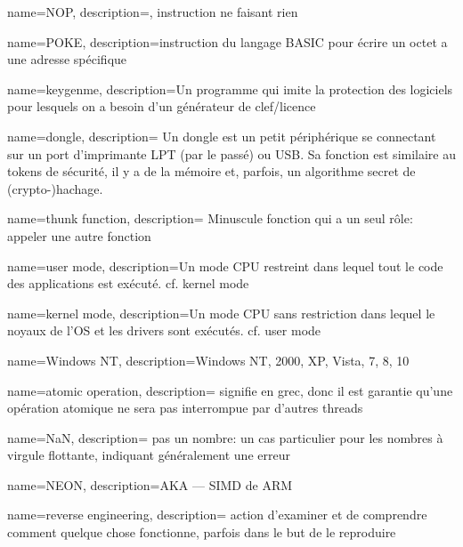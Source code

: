 {
  name=NOP,
  description={, instruction ne faisant rien}
}

{
  name=POKE,
  description={instruction du langage BASIC pour écrire un octet a une adresse spécifique}
}

{
  name=keygenme,
  description={Un programme qui imite la protection des logiciels pour lesquels on a besoin d'un générateur de clef/licence}
} %

{
  name=dongle,
  description={
  Un dongle est un petit périphérique se connectant sur un port d'imprimante LPT (par le passé) ou USB.
  Sa fonction est similaire au tokens de sécurité, il y a de la mémoire et, parfois, un algorithme secret de (crypto-)hachage.
}

{
  name=thunk function,
  description=
  {Minuscule fonction qui a un seul rôle: appeler une autre fonction}
}

{
  name=user mode,
  description={Un mode CPU restreint dans lequel tout le code des applications est exécuté. cf.}
  \gls{kernel mode}
}

{
  name=kernel mode,
  description={Un mode CPU sans restriction dans lequel le noyaux de l'OS et les drivers sont exécutés. cf.}
  \gls{user mode}
}

{
  name=Windows NT,
  description={Windows NT, 2000, XP, Vista, 7, 8, 10}
}

{
  name=atomic operation,
  description={
  signifie  en grec, donc il est garantie qu'une opération atomique ne sera pas interrompue par d'autres threads}
}

{
  name=NaN,
  description={
    pas un nombre: un cas particulier pour les nombres à virgule flottante, indiquant généralement une erreur
  }
}

{
  name=NEON,
  description={\ac{AKA}  --- \ac{SIMD} de ARM}
}

{
  name=reverse engineering,
  description=
  {action d'examiner et de comprendre comment quelque chose fonctionne, parfois dans le but de le reproduire}
}

}
